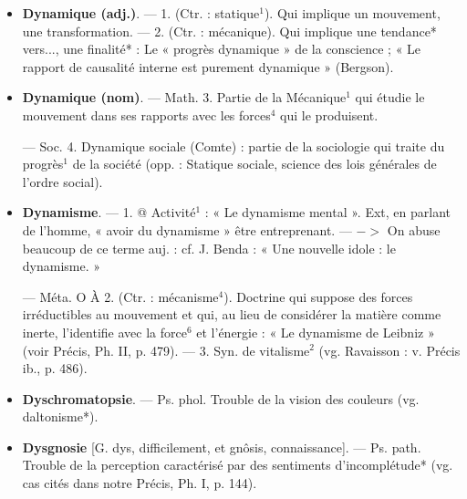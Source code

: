 \begin{itemize}[leftmargin=1cm, label=, itemsep=1pt]
\item {\bf Dynamique (adj.)}. — 1. (Ctr. : statique$^1$). Qui implique un mouvement, une transformation. — 2.
(Ctr. : mécanique). Qui implique une
tendance* vers..., une finalité* : Le
« progrès dynamique » de la conscience ; « Le rapport de causalité
interne est purement dynamique »
(Bergson).

\item {\bf Dynamique (nom)}. — Math. 3. Partie
de la Mécanique$^1$ qui étudie le mouvement dans ses rapports avec les
forces$^4$ qui le produisent.

— Soc. 4. Dynamique sociale
(Comte) : partie de la sociologie qui
traite du progrès$^1$ de la société (opp. :
Statique sociale, science des lois
générales de l’ordre social).

\item {\bf Dynamisme}. — 1. @ Activité$^1$ : « Le
dynamisme mental ». Ext, en parlant de l’homme, « avoir du dynamisme » être entreprenant. —
$->$ On abuse beaucoup de ce terme
auj. : cf. J. Benda : « Une nouvelle
idole : le dynamisme. »

— Méta. O À 2. (Ctr. : mécanisme$^4$). Doctrine qui suppose des
forces irréductibles au mouvement
et qui, au lieu de considérer la
matière comme inerte, l'identifie
avec la force$^6$ et l'énergie : « Le
dynamisme de Leibniz » (voir Précis,
Ph. II, p. 479). — 3. Syn. de vitalisme$^2$ (vg. Ravaisson : v. Précis
ib., p. 486).

\item {\bf Dyschromatopsie}. — Ps. phol. Trouble
de la vision des couleurs (vg. daltonisme*).

\item {\bf Dysgnosie} [G. dys, difficilement, et
gnôsis, connaissance]. — Ps. path.
Trouble de la perception caractérisé 
par des sentiments d’incomplétude*
(vg. cas cités dans notre Précis,
Ph. I, p. 144).

	\end{itemize}
